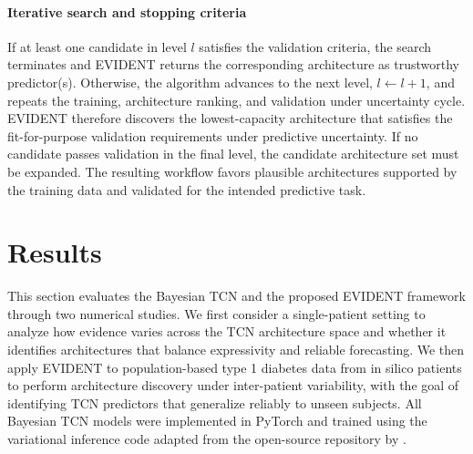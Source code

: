 \documentclass[preprint,12pt]{elsarticle}
\begin{document}
%

\paragraph{Iterative search and stopping criteria}
If at least one candidate in level \(l\) satisfies the validation criteria, the search terminates and EVIDENT returns the corresponding architecture as trustworthy predictor(s). Otherwise, the algorithm advances to the next level, \(l \leftarrow l+1\), and repeats the training, architecture ranking, and validation under uncertainty cycle. EVIDENT therefore discovers the lowest-capacity architecture that satisfies the fit-for-purpose validation requirements under predictive uncertainty. If no candidate passes validation in the final level, the candidate architecture set must be expanded. The resulting workflow favors plausible architectures supported by the training data and validated for the intended predictive task.






\section{Results}\label{sec:results}

This section evaluates the Bayesian TCN and the proposed EVIDENT framework through two numerical studies. We first consider a single-patient setting to analyze how evidence varies across the TCN architecture space and whether it identifies architectures that balance expressivity and reliable forecasting. We then apply EVIDENT to population-based type 1 diabetes data from in silico patients to perform architecture discovery under inter-patient variability, with the goal of identifying TCN predictors that generalize reliably to unseen subjects.
%
All Bayesian TCN models were implemented in PyTorch \cite{paszke2019pytorch} and trained using the variational inference code adapted from the open-source repository by  \cite{shridhar2019comprehensive, deighan_2026_20044677}.

\end{document}
